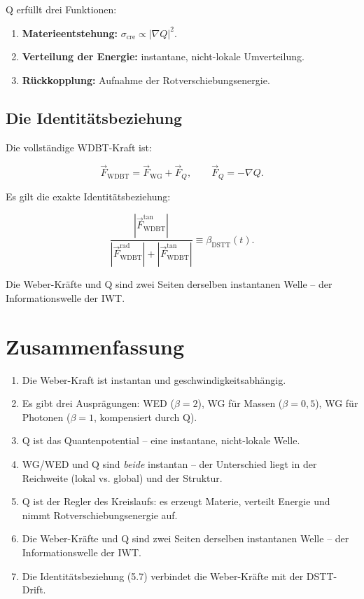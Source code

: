 Q erfüllt drei Funktionen:

\begin{enumerate}
    \item \textbf{Materieentstehung:} \( \sigma_{\text{cre}} \propto |\nabla Q|^2 \).
    \item \textbf{Verteilung der Energie:} instantane, nicht-lokale Umverteilung.
    \item \textbf{Rückkopplung:} Aufnahme der Rotverschiebungsenergie.
\end{enumerate}

\subsection{Die Identitätsbeziehung}

Die vollständige WDBT-Kraft ist:

\begin{equation}
\vec{F}_{\text{WDBT}} = \vec{F}_{\text{WG}} + \vec{F}_Q, \qquad \vec{F}_Q = -\nabla Q. \tag{5.6}
\end{equation}

Es gilt die exakte Identitätsbeziehung:

\begin{equation}
\frac{|\vec{F}_{\text{WDBT}}^{\text{tan}}|}{|\vec{F}_{\text{WDBT}}^{\text{rad}}| + |\vec{F}_{\text{WDBT}}^{\text{tan}}|} \equiv \beta_{\text{DSTT}}(t). \tag{5.7}
\end{equation}

Die Weber-Kräfte und Q sind zwei Seiten derselben instantanen Welle – der Informationswelle der IWT.

\section{Zusammenfassung}

\begin{enumerate}
    \item Die Weber-Kraft ist instantan und geschwindigkeitsabhängig.
    \item Es gibt drei Ausprägungen: WED (\( \beta = 2 \)), WG für Massen (\( \beta = 0,5 \)), WG für Photonen (\( \beta = 1 \), kompensiert durch Q).
    \item Q ist das Quantenpotential – eine instantane, nicht-lokale Welle.
    \item WG/WED und Q sind \emph{beide} instantan – der Unterschied liegt in der Reichweite (lokal vs. global) und der Struktur.
    \item Q ist der Regler des Kreislaufs: es erzeugt Materie, verteilt Energie und nimmt Rotverschiebungsenergie auf.
    \item Die Weber-Kräfte und Q sind zwei Seiten derselben instantanen Welle – der Informationswelle der IWT.
    \item Die Identitätsbeziehung (5.7) verbindet die Weber-Kräfte mit der DSTT-Drift.
\end{enumerate}

